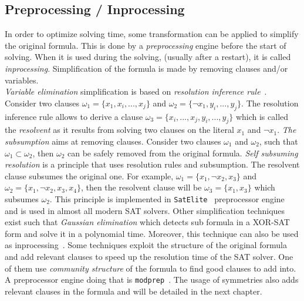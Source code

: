 \subsection{Preprocessing / Inprocessing}
In order to optimize solving time, some transformation can be applied to simplify the original formula.
This is done by a \emph{preprocessing} engine before the start of solving.
When it is used during the solving, (usually after a restart), it is called \emph{inprocessing}.
Simplification of the formula is made by removing clauses and/or variables.\\
\emph{Variable elimination} simplification is based on \emph{resolution inference rule}~\cite{robinson1965machine}.
Consider two clauses $\omega_1 = \{x_1, x_i, ..., x_j \}$ and $\omega_2 = \{\neg x_1, y_i, ..., y_j\}$.
The resolution inference rule allows to derive a clause $\omega_3 = \{x_i, ..., x_j, y_i, ..., y_j\}$ which is called
the \emph{resolvent} as it results from solving two clauses on the literal $x_1$ and $\neg x_1$.
\emph{The subsumption} aims at removing  clauses. Consider two clauses $\omega_1$ and $\omega_2$, such that
$\omega_1 \subset  \omega_2$, then $\omega_2$ can be safely removed from the original formula.
\emph{Self subsuming resolution} is a principle that uses resolution rules and subsumption.
The resolvent clause subsumes the original one. For example, $\omega_1 = \{x_1, \neg x_2, x_3\}$ and $\omega_2 = \{x_1, \neg x_2, x_3, x_4\}$,
 then the resolvent clause will be $\omega_3 = \{x_1, x_3\}$ which subsumes $\omega_2$. This principle
is implemented in \texttt{SatElite}~\cite{een2005effective} preprocessor engine and is used in almost all modern SAT solvers.
Other simplification techniques exist such that \emph{Gaussian elimination} which detects sub formula in a XOR-SAT
form and solve it in a polynomial time. Moreover, this technique can also be used as inprocessing~\cite{soos2010enhanced}. 
Some techniques exploit the structure of the original formula and add relevant clauses to speed up the resolution
time of the SAT solver. One of them use \textit{community structure} of the formula to find good clauses to add into.
A preprocessor engine doing that is  \texttt{modprep}~\cite{ansotegui2015using}.
The usage of symmetries also adds relevant clauses in the formula and will be detailed in the next chapter.
